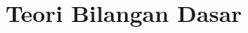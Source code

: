 \documentclass[12pt]{scrartcl}
\begin{document}
\renewcommand*\contentsname{Daftar Isi}
\tableofcontents

\newpage

\title{Teori Bilangan Dasar}


    
    
    
    



\end{document}
